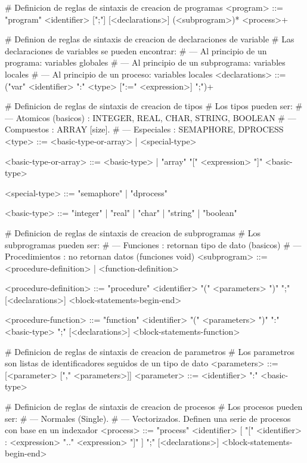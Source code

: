 \begin{BNFCode}
# Definicion de reglas de sintaxis de creacion de programas
<program> ::= "program" <identifier> [";"] [<declarations>] 
    (<subprogram>)* <process>+

# Definion de reglas de sintaxis de creacion de declaraciones de variable
# Las declaraciones de variables se pueden encontrar:
#  --- Al principio de un programa: variables globales
#  --- Al principio de un subprograma: variables locales
#  --- Al principio de un proceso: variables locales
<declarations> ::= ("var" <identifier> ":" <type> 
    [":=" <expression>] ";")+

# Definicion de reglas de sintaxis de creacion de tipos
# Los tipos pueden ser:
#  --- Atomicos (basicos) : INTEGER, REAL, CHAR, STRING, BOOLEAN
#  --- Compuestos : ARRAY [size].
#  --- Especiales : SEMAPHORE, DPROCESS
<type> ::= <basic-type-or-array>
    | <special-type>

<basic-type-or-array> ::= <basic-type>
    | "array" "[" <expression> "]" <basic-type>

<special-type> ::= "semaphore"
    | "dprocess"

<basic-type> ::= "integer"
    | "real"
    | "char"
    | "string"
    | "boolean"
 
# Definicion de reglas de sintaxis de creacion de subprogramas
# Los subprogramas pueden ser:
#  --- Funciones : retornan tipo de dato (basicos)
#  --- Procedimientos : no retornan datos (funciones void)
<subprogram> ::= <procedure-definition>
	| <function-definition>


<procedure-definition> ::= "procedure" <identifier> 
    "(" <parameters> ")" ";" [<declarations>] 
    <block-statements-begin-end>
	
<procedure-function> ::= "function" <identifier> 
    "(" <parameters> ")" ":" <basic-type>
    ";" [<declarations>] <block-statements-function>
    
# Definicion de reglas de sintaxis de creacion de parametros
# Los parametros son listas de identificadores seguidos de un tipo de dato
<parameters> ::= [<parameter> ["," <parameters>]]
<parameter> ::= <identifier> ":" <basic-type>

# Definicion de reglas de sintaxis de creacion de procesos
# Los procesos pueden ser:
#   --- Normales (Single).
#   --- Vectorizados. Definen una serie de procesos con base en un indexador
<process> ::= "process" <identifier> [ "[" <identifier> : 
    <expression> ".." <expression> "]" ] ";" 
    [<declarations>] <block-statements-begin-end>



\end{BNFCode}
